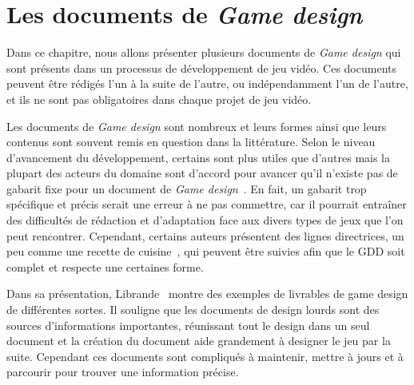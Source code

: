 \chapter{Les documents de \emph{Game design}}
\label{gdd.sect}

Dans ce chapitre, nous allons pr\'esenter plusieurs documents de \emph{Game design} qui sont présents dans un processus de développement de jeu vidéo.
Ces documents peuvent être rédigés l'un à la suite de l'autre, ou indépendamment l'un de l'autre, et ils ne sont pas obligatoires dans chaque projet de jeu vidéo.



Les documents de \emph{Game design} sont nombreux et leurs formes ainsi que leurs contenus sont souvent remis en question dans la littérature.
Selon le niveau d'avancement du développement, certains sont plus utiles que d'autres mais la plupart des acteurs du domaine sont d'accord pour avancer qu'il n'existe pas de gabarit fixe pour un document de \emph{Game design}~\cite{GD_theory_rouse}.
En fait, un gabarit trop sp\'ecifique et précis serait une erreur à ne pas commettre, car il pourrait entraîner des difficultés de rédaction et d'adaptation face aux divers types de jeux que l'on peut rencontrer.
Cependant, certains auteurs présentent des lignes directrices, un peu comme une recette de cuisine~\cite{LevelUpRogers2014}, qui peuvent être suivies afin que le GDD soit complet et respecte une certaines forme. 

Dans sa présentation, Librande~\cite{onepage_librande} montre des exemples de livrables de game design de différentes sortes.
Il souligne que les documents de design lourds sont des sources d'informations importantes, réunissant tout le design dans un seul document et la création du document aide grandement à designer le jeu par la suite.
Cependant ces documents sont compliqués à maintenir, mettre à jours et à parcourir pour trouver une information précise.



